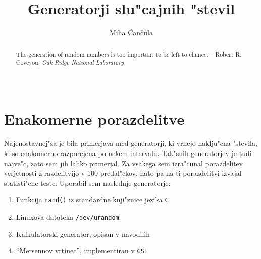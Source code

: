 \documentclass[a4paper,10pt]{article}
\title{Generatorji slu"cajnih "stevil}
\author{Miha \v Can\v cula}
\begin{document}
 \maketitle

\begin{abstract}
 The generation of random numbers is too important to be left to chance.
     -- Robert R. Coveyou, \textit{Oak Ridge National Laboratory}
\.\\
\begin{figure}[h!]
\centering
  \\
\end{figure}
\end{abstract}

\section{Enakomerne porazdelitve}

Najenostavnej"sa je bila primerjava med generatorji, ki vrnejo naklju"cna "stevila, ki so enakomerno razporejena po nekem intervalu. Tak"snih generatorjev je tudi najve"c, zato sem jih lahko primerjal. Za vsakega sem izra"cunal porazdelitev verjetnosti z razdelitvijo v 100 predal"ckov, nato pa na ti porazdelitvi izvajal statisti"cne teste. Uporabil sem naslednje generatorje:

\begin{enumerate}
 \item Funkcija \texttt{rand()} iz standardne knji"znice jezika \texttt{C}
 \item Linuxova datoteka \texttt{/dev/urandom}
 \item Kalkulatorski generator, opisan v navodilih
 \item ``Mersennov vrtinec'', implementiran v \texttt{GSL} 
\end{enumerate}
\end{document}
